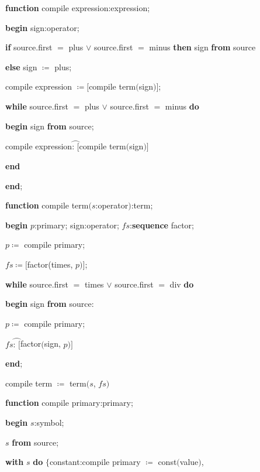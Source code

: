 \noindent
\textbf{function} compile expression:expression;

\noindent
\quad \textbf{begin} sign:operator;

\noindent
\quad \quad \textbf{if} source.first $=$ plus $\vee$ source.first $=$ minus \textbf{then} sign \textbf{from} source

\noindent
\quad \quad \textbf{else} sign $\coloneq$ plus;

\noindent
\quad \quad compile expression $\coloneq [$compile term$($sign$)]$;

\noindent
\quad \quad \textbf{while} source.first $=$ plus $\vee$ source.first $=$ minus \textbf{do}

\noindent
\quad \quad \quad \textbf{begin} sign \textbf{from} source;

\noindent
\quad \quad \quad \quad compile expression$\wideparen{\text{:\ }[}$compile term$($sign$)]$

\noindent
\quad \quad \quad \textbf{end}

\noindent
\quad \textbf{end};

\noindent
\textbf{function} compile term$(s$:operator$)$:term;

\noindent
\quad \textbf{begin} $p$:primary; sign:operator; $fs$:\textbf{sequence} factor;

\noindent
\quad \quad $p\coloneq$ compile primary;

\noindent
\quad \quad $fs \coloneq [$factor(times, $p)]$;

\noindent
\quad \quad \textbf{while} source.first $=$ times $\vee$ source.first $=$ div \textbf{do}

\noindent
\quad \quad \quad \textbf{begin} sign \textbf{from} source:

\noindent
\quad \quad \quad \quad $p\coloneq$ compile primary;

\noindent
\quad \quad \quad \quad $fs\wideparen{\text{: }[}$factor$($sign, $p)]$

\noindent
\quad \quad \quad \textbf{end};

\noindent
\quad \quad compile term $\coloneq$ term$(s$, $fs)$

\noindent
\textbf{function} compile primary:primary;

\noindent
\quad \textbf{begin} $s$:symbol;

\noindent
\quad \quad $s$ \textbf{from} source;

\noindent
\quad \quad \textbf{with} $s$ \textbf{do} $\{$constant:compile primary $\coloneq$ const$($value$)$,

